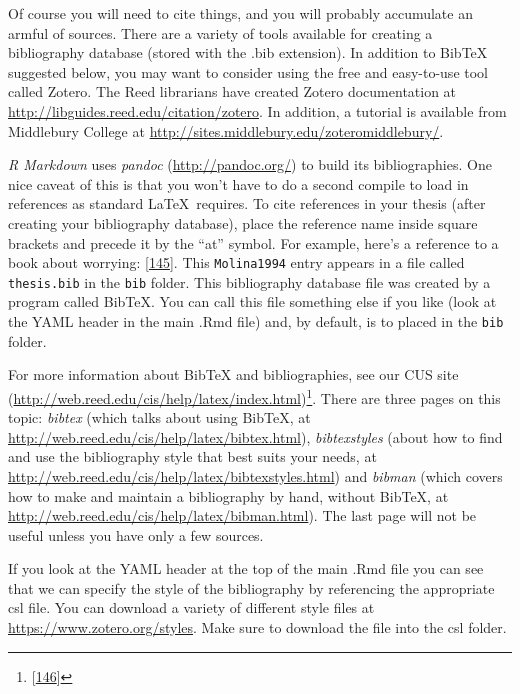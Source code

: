 \documentclass[12pt,twoside]{reedthesis}
\begin{document}
  Of course you will need to cite things, and you will probably accumulate
  an armful of sources. There are a variety of tools available for
  creating a bibliography database (stored with the .bib extension). In
  addition to BibTeX suggested below, you may want to consider using the
  free and easy-to-use tool called Zotero. The Reed librarians have
  created Zotero documentation at
  \url{http://libguides.reed.edu/citation/zotero}. In addition, a tutorial
  is available from Middlebury College at
  \url{http://sites.middlebury.edu/zoteromiddlebury/}.
  
  \emph{R Markdown} uses \emph{pandoc} (\url{http://pandoc.org/}) to build
  its bibliographies. One nice caveat of this is that you won't have to do
  a second compile to load in references as standard \LaTeX~requires. To
  cite references in your thesis (after creating your bibliography
  database), place the reference name inside square brackets and precede
  it by the ``at'' symbol. For example, here's a reference to a book about
  worrying: {[}\protect\hyperlink{ref-Molina1994}{145}{]}. This
  \texttt{Molina1994} entry appears in a file called \texttt{thesis.bib}
  in the \texttt{bib} folder. This bibliography database file was created
  by a program called BibTeX. You can call this file something else if you
  like (look at the YAML header in the main .Rmd file) and, by default, is
  to placed in the \texttt{bib} folder.
  
  For more information about BibTeX and bibliographies, see our CUS site
  (\url{http://web.reed.edu/cis/help/latex/index.html})\footnote{{[}\protect\hyperlink{ref-reedweb2007}{146}{]}}.
  There are three pages on this topic: \emph{bibtex} (which talks about
  using BibTeX, at \url{http://web.reed.edu/cis/help/latex/bibtex.html}),
  \emph{bibtexstyles} (about how to find and use the bibliography style
  that best suits your needs, at
  \url{http://web.reed.edu/cis/help/latex/bibtexstyles.html}) and
  \emph{bibman} (which covers how to make and maintain a bibliography by
  hand, without BibTeX, at
  \url{http://web.reed.edu/cis/help/latex/bibman.html}). The last page
  will not be useful unless you have only a few sources.
  
  If you look at the YAML header at the top of the main .Rmd file you can
  see that we can specify the style of the bibliography by referencing the
  appropriate csl file. You can download a variety of different style
  files at \url{https://www.zotero.org/styles}. Make sure to download the
  file into the csl folder.
  
\end{document}
